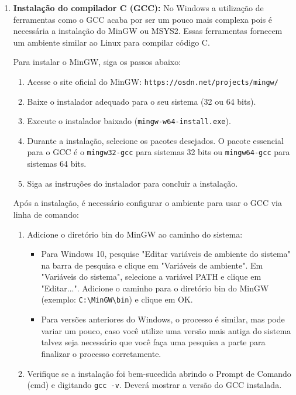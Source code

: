 \documentclass{book}
\begin{document}
\begin{enumerate}
    \item \textbf{Instalação do compilador C (GCC):} 
        No Windows a utilização de ferramentas como o GCC acaba por ser 
        um pouco mais complexa pois é necessária a instalação do MinGW ou 
        MSYS2. Essas ferramentas fornecem um ambiente similar ao Linux 
        para compilar código C.

        Para instalar o MinGW, siga os passos abaixo:

        \begin{enumerate}
            \item Acesse o site oficial do MinGW: \texttt{https://osdn.net/projects/mingw/}
            \item Baixe o instalador adequado para o seu sistema (32 ou 64 bits).
            \item Execute o instalador baixado (\texttt{mingw-w64-install.exe}).
            \item Durante a instalação, selecione os pacotes desejados. O 
                pacote essencial para o GCC é o \texttt{mingw32-gcc} para 
                sistemas 32 bits ou \texttt{mingw64-gcc} para sistemas 64 bits.
            \item Siga as instruções do instalador para concluir a instalação.
        \end{enumerate}

        Após a instalação, é necessário configurar o ambiente para usar o GCC via linha de comando:

        \begin{enumerate}
            \item Adicione o diretório bin do MinGW ao caminho do sistema:
                \begin{itemize}
                    \item Para Windows 10, pesquise "Editar variáveis de ambiente 
                        do sistema" na barra de pesquisa e clique em "Variáveis 
                        de ambiente". Em "Variáveis do sistema", selecione a 
                        variável PATH e clique em "Editar...". Adicione o caminho 
                        para o diretório bin do MinGW (exemplo: 
                        \texttt{C:\textbackslash MinGW\textbackslash bin}) e 
                        clique em OK.
                    \item Para versões anteriores do Windows, o processo é 
                        similar, mas pode variar um pouco, caso você utilize 
                        uma versão mais antiga do sistema talvez seja necessário 
                        que você faça uma pesquisa a parte para finalizar o 
                        processo corretamente.
                \end{itemize}
            \item Verifique se a instalação foi bem-sucedida abrindo o Prompt de Comando (cmd) e digitando \texttt{gcc -v}. Deverá mostrar a versão do GCC instalada.
        \end{enumerate}
    

\end{enumerate}
\end{document}
